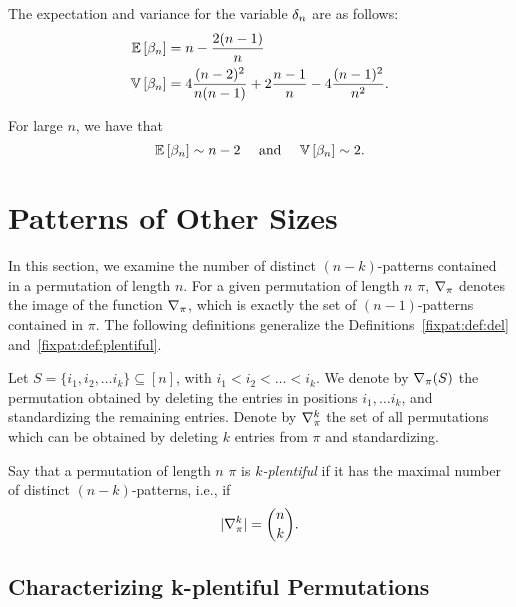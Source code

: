   \begin{corollary}\label{fixpat:cor:exvar}
    The expectation and variance for the variable $\delta_n$ are as follows:
    $$ \begin{aligned} 
       \mathbb{E}\left[ \beta_n \right] &= n - \frac{2(n-1)}{n} \\
        \mathbb{V}\left[ \beta_n \right] &= 4\frac{(n-2)^2}{n(n-1)} + 2\frac{n-1}{n} -
        4\frac{(n-1)^2}{n^2}. 
        \end{aligned} $$
  \end{corollary}

  \begin{corollary}
    For large $n$, we have that 
    $$ \mathbb{E}\left[ \beta_n \right] \sim n - 2 \text{ \quad and \quad }
      \mathbb{V}\left[ \beta_n \right] \sim 2.$$
  \end{corollary}


\section{Patterns of Other Sizes}
  \label{fixpat:sec:othersizes}
  
  In this section, we examine the number of distinct $(n-k)$-patterns contained
  in a permutation of length $n$. For a given permutation of length $n$ $\pi$, $\nabla_\pi$ denotes
  the image of the function $\nabla_\pi$, which is exactly the set of
  $(n-1)$-patterns contained in $\pi$. The following definitions generalize
  the Definitions~\ref{fixpat:def:del} and~\ref{fixpat:def:plentiful}. 

  \begin{definition} \label{fixpat:def:delpik}
    Let $S = \{i_1, i_2, \dots i_k\} \subseteq [n]$, with $i_1 < i_2 < \dots
    < i_k$. We denote by $\nabla_\pi(S)$ the permutation obtained by deleting the
    entries in positions $i_1, \dots i_k$, and standardizing the remaining
    entries. Denote by $\nabla_\pi^k$ the set of all permutations which can be
    obtained by deleting $k$ entries from $\pi$ and standardizing. 
  \end{definition}

  \begin{definition} \label{fixpat:def:kplentiful}
    Say that a permutation of length $n$ $\pi$ is \emph{$k$-plentiful} if it has the maximal
    number of distinct $(n-k)$-patterns, i.e., if 
    $$|\nabla_\pi^k| = \binom{n}{k}.$$
  \end{definition}

\subsection{Characterizing k-plentiful Permutations}

